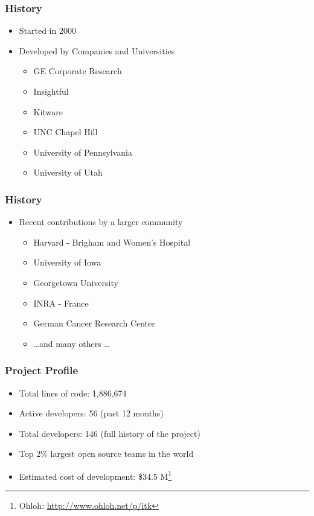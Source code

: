 \begin{frame}
\frametitle{History}
\begin{itemize}
\item Started in 2000
\pause
\item Developed by Companies and Universities
\begin{itemize}
\item GE Corporate Research
\item Insightful
\item Kitware
\item UNC Chapel Hill
\item University of Pennsylvania
\item University of Utah
\end{itemize}
\end{itemize}
\end{frame}

\begin{frame}
\frametitle{History}
\begin{itemize}
\item Recent contributions by a larger community
\begin{itemize}
\item Harvard - Brigham and Women's Hospital
\item University of Iowa
\item Georgetown University
\item INRA - France
\item German Cancer Research Center
\item \ldots and many others \ldots
\end{itemize}
\end{itemize}
\end{frame}

\begin{frame}
\frametitle{Project Profile}
\begin{itemize}
\item Total lines of code: 1,886,674
\item Active developers: 56 (past 12 months)
\item Total developers: 146 (full history of the project)
\item Top 2\% largest open source teams in the world
\item Estimated cost of development: \$34.5 M\footnote{Ohloh: \url{http://www.ohloh.net/p/itk}}
\end{itemize}
\end{frame}

